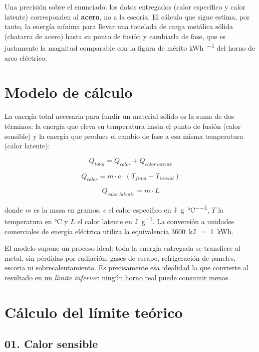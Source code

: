 \documentclass[11pt,letterpaper]{article}
\begin{document}
Una precisión sobre el enunciado: los datos entregados (calor específico y calor
latente) corresponden al \textbf{acero}, no a la escoria. El cálculo que sigue
estima, por tanto, la energía mínima para llevar una tonelada de carga metálica
sólida (chatarra de acero) hasta su punto de fusión y cambiarla de fase, que es
justamente la magnitud comparable con la figura de mérito
\si{\kWh\per\ton} del horno de arco eléctrico.

\section{Modelo de cálculo}

La energía total necesaria para fundir un material sólido es la suma de dos
términos: la energía que eleva su temperatura hasta el punto de fusión (calor
sensible) y la energía que produce el cambio de fase a esa misma temperatura
(calor latente):

\begin{equation}
  Q_{total} = Q_{calor} + Q_{calor\ latente}
  \label{eq:total}
\end{equation}

\begin{equation}
  Q_{calor} = m \cdot c \cdot (T_{final} - T_{inicial})
  \label{eq:sensible}
\end{equation}

\begin{equation}
  Q_{calor\ latente} = m \cdot L
  \label{eq:latente}
\end{equation}

donde $m$ es la masa en gramos, $c$ el calor específico en
\si{\joule\per\gram\per\celsius}, $T$ la temperatura en \si{\celsius} y $L$ el
calor latente en \si{\joule\per\gram}. La conversión a unidades comerciales de
energía eléctrica utiliza la equivalencia \SI{3600}{\kilo\joule} $=$
\SI{1}{\kWh}.

El modelo supone un proceso ideal: toda la energía entregada se transfiere al
metal, sin pérdidas por radiación, gases de escape, refrigeración de paneles,
escoria ni sobrecalentamiento. Es precisamente esa idealidad la que convierte al
resultado en un \emph{límite inferior}: ningún horno real puede consumir menos.

\section{Cálculo del límite teórico}

\subsection*{01. Calor sensible}
\end{document}
